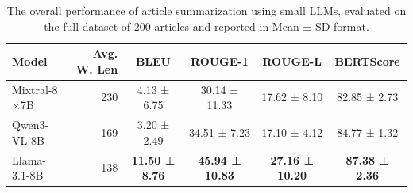 \documentclass[bdcc,article,submit,pdftex,moreauthors]{Definitions/mdpi}
\begin{document}
\begin{table}[H] 
\small
\caption{The overall performance of article summarization using small LLMs, evaluated on the full dataset of 200 articles and reported in Mean ± SD format.\label{tab:allresults}}
\begin{tabularx}{\textwidth}{lrcccc}
\toprule
\textbf{Model}	& \textbf{Avg. W. Len}     & \textbf{BLEU} & \textbf{ROUGE-1} & \textbf{ROUGE-L} & \textbf{BERTScore}\\
\midrule
Mixtral-8$\times$7B		& 230		& 4.13 ± 6.75  & 30.14 ± 11.33 & 17.62 ± 8.10 & 82.85 ± 2.73 \\
Qwen3-VL-8B		    & 169	    & 3.20 ± 2.49  & 34.51 ± 7.23 & 17.10 ± 4.12 & 84.77 ± 1.32 \\
Llama-3.1-8B		& 138		& \textbf{11.50 ± 8.76} & \textbf{45.94 ± 10.83} & \textbf{27.16 ± 10.20} & \textbf{87.38 ± 2.36} \\%
\bottomrule
\end{tabularx}
\end{table}


\begin{table}[htbp]
\small
\centering
\caption{Statistical significance ($p$-values) of performance differences between models across the full dataset.}
\label{tab:p_value_comparisons}
\end{table}
\end{document}
